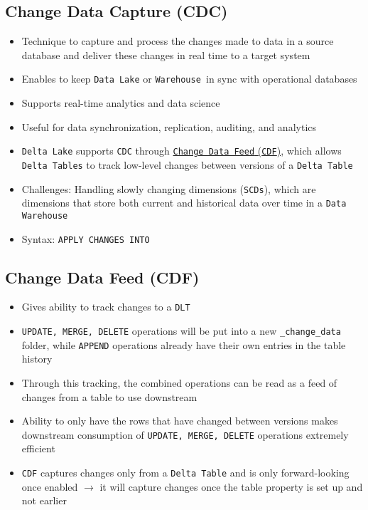 \documentclass[11pt]{scrartcl}
\begin{document}
\subsection{Change Data Capture (CDC)} \label{cdc}
\begin{itemize}
	\item Technique to capture and process the changes made to data in a source database and deliver these changes in real time to a target system
	\item Enables to keep \texttt{Data Lake} or \texttt{Warehouse }in sync with operational databases
	\item Supports real-time analytics and data science
	\item Useful for data synchronization, replication, auditing, and analytics
	\item \texttt{Delta Lake} supports \texttt{CDC} through \hyperref[cdf]{\texttt{Change Data Feed} (\texttt{CDF})}, which allows \texttt{Delta Tables} to track low-level changes between versions of a \texttt{Delta Table}
	\item Challenges: Handling slowly changing dimensions (\texttt{SCDs}), which are dimensions that store both current and historical data over time in a \texttt{Data Warehouse}
	\item Syntax: \texttt{APPLY CHANGES INTO}
\end{itemize}

\subsection{Change Data Feed (CDF)} \label{cdf}
\begin{itemize}
	\item Gives ability to track changes to a \texttt{DLT}
	\item \texttt{UPDATE, MERGE, DELETE} operations will be put into a new \texttt{\_change\_data} folder, while \texttt{APPEND} operations already have their own entries in the table history
	\item Through this tracking, the combined operations can be read as a feed of changes from a table to use downstream
	\item Ability to only have the rows that have changed between versions makes downstream consumption of \texttt{UPDATE, MERGE, DELETE} operations extremely efficient
	\item \texttt{CDF} captures changes only from a \texttt{Delta Table} and is only forward-looking once enabled $\to$ it will capture changes once the table property is set up and not earlier
\end{itemize}
\end{document}
